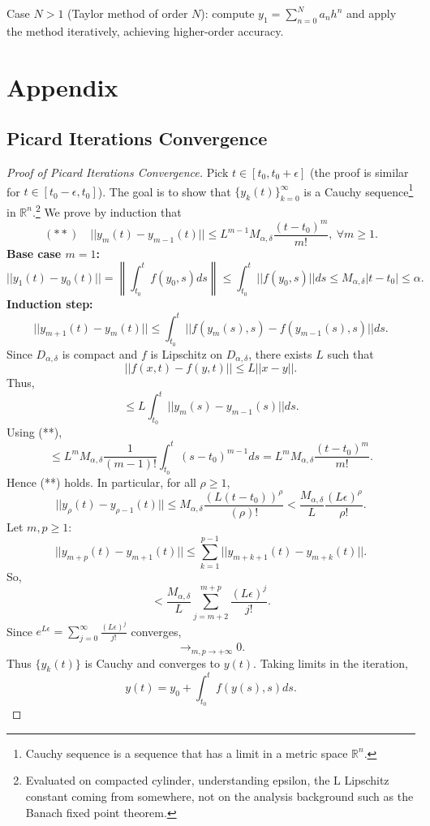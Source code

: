 \documentclass{article}
\newcommand{\R}{\mathbb{R}}
\begin{document}
Case $N > 1$ (Taylor method of order $N$): compute $y_1 = \sum_{n=0}^N a_n h^n$ and apply the method iteratively, achieving higher-order accuracy.

\section{Appendix}
\subsection{Picard Iterations Convergence}
\begin{proof}[Proof of Picard Iterations Convergence]
    \label{pf:picard-convergence}
    Pick $t \in [t_0, t_0 + \epsilon]$ (the proof is similar for $t \in [t_0 - \epsilon, t_0]$).
    The goal is to show that $\{y_k(t)\}_{k=0}^{\infty}$ is a Cauchy sequence\footnote{Cauchy sequence is a sequence that has a limit in a metric space $\R^n$.} in $\R^n$.\footnote{Evaluated on compacted cylinder, understanding epsilon, the L Lipschitz constant coming from somewhere, not on the analysis background such as the Banach fixed point theorem.}
    We prove by induction that
    \[(**)\quad ||y_m(t) - y_{m - 1}(t)|| \leq L^{m - 1}M_{\alpha,\delta} \frac{(t - t_0)^m}{m!},\:\forall m \geq 1.\]
    \textbf{Base case \(m=1\):}
    \[||y_1(t) - y_0(t)|| = \left\| \int_{t_0}^{t} f(y_0,s)ds \right\| \leq \int_{t_0}^{t}||f(y_0,s)||ds \leq M_{\alpha,\delta}|t - t_0| \leq \alpha.\]
    \textbf{Induction step:}
    \[||y_{m + 1}(t) - y_m(t)|| \leq \int_{t_0}^{t}||f(y_m(s),s) - f(y_{m-1}(s),s)||ds.\]
    Since $D_{\alpha,\delta}$ is compact and $f$ is Lipschitz on $D_{\alpha,\delta}$, there exists $L$ such that
    \[||f(x,t) - f(y,t)|| \leq L||x - y||.\]
    Thus,
    \[\leq L \int_{t_0}^{t}||y_m(s) - y_{m - 1}(s)||ds.\]
    Using (**),
    \[\leq L^m M_{\alpha,\delta} \frac{1}{(m-1)!} \int_{t_0}^{t}(s - t_0)^{m-1}ds
    = L^m M_{\alpha,\delta} \frac{(t - t_0)^m}{m!}.\]
    Hence (**) holds.
    In particular, for all $\rho \geq 1$,
    \[||y_\rho(t) - y_{\rho-1}(t)|| \leq M_{\alpha,\delta} \frac{(L(t - t_0))^{\rho}}{(\rho)!} < \frac{M_{\alpha,\delta}}{L}\frac{(L\epsilon)^\rho}{\rho!}.\]
    Let $m,p \geq 1$:
    \[||y_{m+p}(t) - y_{m+1}(t)|| \leq \sum_{k=1}^{p-1}||y_{m+k+1}(t) - y_{m+k}(t)||.\]
    So,
    \[< \frac{M_{\alpha,\delta}}{L}\sum_{j=m+2}^{m+p}\frac{(L\epsilon)^j}{j!}.\]
    Since \(e^{L\epsilon} = \sum_{j=0}^{\infty}\frac{(L\epsilon)^j}{j!}\) converges,
    \[\to_{m,p \to +\infty} 0.\]
    Thus $\{y_k(t)\}$ is Cauchy and converges to $y(t)$.
    Taking limits in the iteration,
    \[y(t) = y_0 + \int_{t_0}^{t} f(y(s),s)ds.\]
\end{proof}
\end{document}
